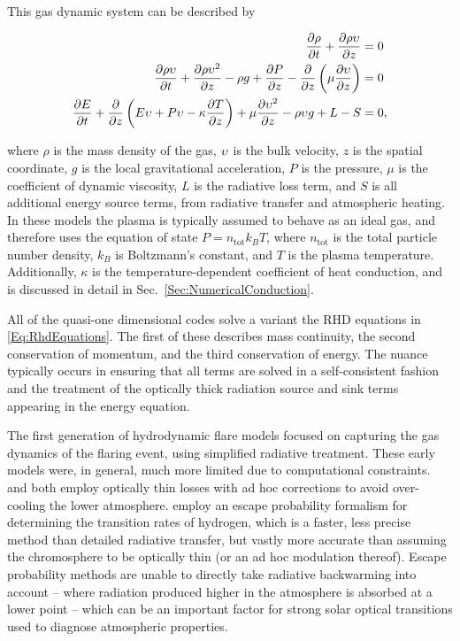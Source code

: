This gas dynamic system can be described by

\begin{equation}
    \begin{aligned}
    \frac{\partial \rho}{\partial t} + \frac{\partial \rho \upsilon}{\partial z} &= 0\\
    \frac{\partial \rho \upsilon}{\partial t} + \frac{\partial \rho \upsilon^2}{\partial z} - \rho g + \frac{\partial P}{\partial z} - \frac{\partial}{\partial z}\left(\mu \frac{\partial \upsilon}{\partial z}\right) &= 0\\
    \frac{\partial E}{\partial t} + \frac{\partial}{\partial z}\left( E\upsilon + P\upsilon - \kappa\frac{\partial T}{\partial z} \right)+ \mu\frac{\partial \upsilon^2}{\partial z} -\rho \upsilon g + L - S &= 0,
    \end{aligned}\label{Eq:RhdEquations}
\end{equation}

where $\rho$ is the mass density of the gas, $\upsilon$ is the bulk velocity, $z$ is the spatial coordinate, $g$ is the local gravitational acceleration, $P$ is the pressure, $\mu$ is the coefficient of dynamic viscosity, $L$ is the radiative loss term, and $S$ is all additional energy source terms, from radiative transfer and atmospheric heating.
In these models the plasma is typically assumed to behave as an ideal gas, and therefore uses the equation of state
$P = n_{\mathrm{tot}} k_B T$, where $n_{\mathrm{tot}}$ is the total particle number density, $k_B$ is Boltzmann's constant, and $T$ is the plasma temperature. Additionally, $\kappa$ is the temperature-dependent coefficient of heat conduction, and is discussed in detail in Sec.~\ref{Sec:NumericalConduction}.

All of the quasi-one dimensional codes solve a variant the RHD equations in \eqref{Eq:RhdEquations}. The first of these describes mass continuity, the second conservation of momentum, and the third conservation of energy.
The nuance typically occurs in ensuring that all terms are solved in a self-consistent fashion and the treatment of the optically thick radiation source and sink terms appearing in the energy equation.

The first generation of hydrodynamic flare models \citet{Nagai1980,Mariska1982,McClymont1983} focused on capturing the gas dynamics of the flaring event, using simplified radiative treatment.
These early models were, in general, much more limited due to computational constraints. \citet{Nagai1980} and \citet{Mariska1982} both employ optically thin losses with ad hoc corrections to avoid over-cooling the lower atmosphere.
\citet{McClymont1983} employ an escape probability formalism for determining the transition rates of hydrogen, which is a faster, less precise method than detailed radiative transfer, but vastly more accurate than assuming the chromosphere to be optically thin (or an ad hoc modulation thereof).
Escape probability methods are unable to directly take radiative backwarming into account -- where radiation produced higher in the atmosphere is absorbed at a lower point -- which can be an important factor for strong solar optical transitions used to diagnose atmospheric properties.

